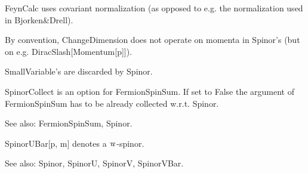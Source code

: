 

FeynCalc uses covariant normalization (as opposed to e.g. the normalization used in Bjorken\&{}Drell).







By convention, ChangeDimension does not operate on momenta in Spinor's (but on e.g. { }DiracSlash[Momentum[p]]). 





SmallVariable's are discarded by Spinor.





SpinorCollect is an option for FermionSpinSum. If set to False the { }argument of FermionSpinSum has to be already collected w.r.t.
  Spinor.

See also: { }FermionSpinSum, Spinor.



SpinorUBar[p, m] denotes a \(\overvar{u}{\_}\)-spinor.

See also:  Spinor, SpinorU, SpinorV, SpinorVBar.


